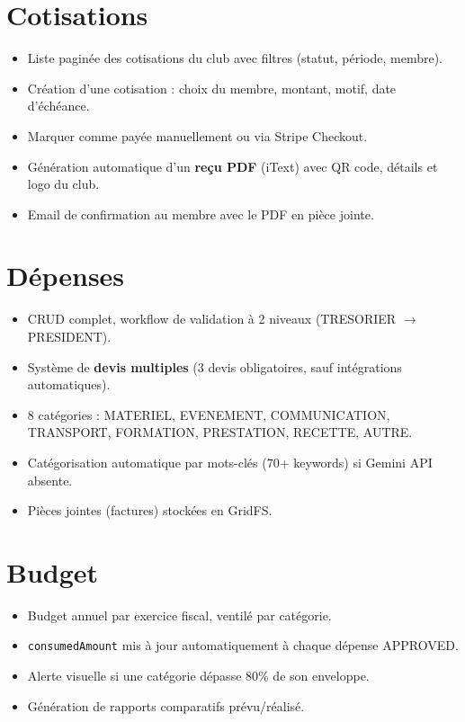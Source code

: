 \documentclass[11pt,a4paper]{report}
\begin{document}
\section{Cotisations}
\begin{itemize}
  \item Liste paginée des cotisations du club avec filtres
        (statut, période, membre).
  \item Création d'une cotisation : choix du membre, montant, motif, date
        d'échéance.
  \item Marquer comme payée manuellement ou via Stripe Checkout.
  \item Génération automatique d'un \textbf{reçu PDF} (iText) avec QR code,
        détails et logo du club.
  \item Email de confirmation au membre avec le PDF en pièce jointe.
\end{itemize}

\section{Dépenses}
\begin{itemize}
  \item CRUD complet, workflow de validation à 2 niveaux
        (TRESORIER \(\rightarrow\) PRESIDENT).
  \item Système de \textbf{devis multiples} (3 devis obligatoires, sauf
        intégrations automatiques).
  \item 8 catégories : MATERIEL, EVENEMENT, COMMUNICATION, TRANSPORT,
        FORMATION, PRESTATION, RECETTE, AUTRE.
  \item Catégorisation automatique par mots-clés (70+ keywords) si Gemini API
        absente.
  \item Pièces jointes (factures) stockées en GridFS.
\end{itemize}

\section{Budget}

\begin{itemize}
  \item Budget annuel par exercice fiscal, ventilé par catégorie.
  \item \texttt{consumedAmount} mis à jour automatiquement à chaque dépense
        APPROVED.
  \item Alerte visuelle si une catégorie dépasse 80\% de son enveloppe.
  \item Génération de rapports comparatifs prévu/réalisé.
\end{itemize}
\end{document}
